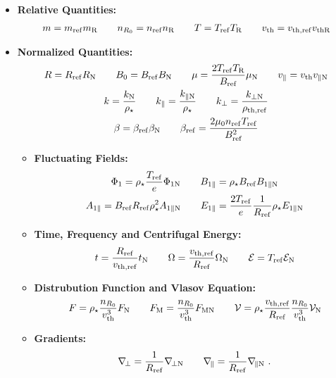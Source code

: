 \begin{itemize}
    \item \textbf{Relative Quantities:}
        \begin{gather}
            m = m_\mathrm{ref} m_\mathrm{R} \qquad n_{R_0} = n_\mathrm{ref} n_\mathrm{R} \qquad T = T_\mathrm{ref} T_\mathrm{R} \qquad v_\mathrm{th} = v_{\mathrm{th},\mathrm{ref}} v_{\mathrm{th} \mathrm{R}}
        \end{gather}
    \item \textbf{Normalized Quantities:}
        \begin{gather}
            R = R_\mathrm{ref} R_\mathrm{N} \qquad B_0 = B_\mathrm{ref} B_\mathrm{N} \qquad \mu = \frac{2 T_\mathrm{ref} T_\mathrm{R}}{B_\mathrm{ref}} \mu_\mathrm{N} \qquad v_\parallel = v_\mathrm{th} v_{\parallel \mathrm{N}} \\
            k = \frac{k_\mathrm{N}}{\rho_\star} \qquad k_\parallel = \frac{k_{\parallel \mathrm{N}}}{\rho_\star} \qquad k_\perp = \frac{k_{\perp \mathrm{N}}}{\rho_{\mathrm{th},\mathrm{ref}}} \\
            \beta = \beta_\mathrm{ref} \beta_\mathrm{N} \qquad \beta_\mathrm{ref} = \frac{2 \mu_0 n_\mathrm{ref} T_\mathrm{ref}}{B_\mathrm{ref}^2}
        \end{gather}
        \begin{itemize}
            \item \textbf{Fluctuating Fields:}
                \begin{gather}
                    \Phi_1 = \rho_\star \frac{T_\mathrm{ref}}{e} \Phi_{1 \mathrm{N}} \qquad B_{1\parallel} = \rho_\star B_\mathrm{ref} B_{1\parallel \mathrm{N}} \\
                    A_{1\parallel} = B_\mathrm{ref} R_\mathrm{ref} \rho_\star^2 A_{1\parallel \mathrm{N}} \qquad E_{1\parallel} = \frac{2T_\mathrm{ref}}{e} \frac{1}{R_\mathrm{ref}} \rho_\star E_{1\parallel \mathrm{N}}
                \end{gather}
            \item \textbf{Time, Frequency and Centrifugal Energy:}
                \begin{gather}
                    t = \frac{R_\mathrm{ref}}{v_{\mathrm{th},\mathrm{ref}}} t_\mathrm{N} \qquad \Omega = \dfrac{v_{\mathrm{th},\mathrm{ref}}}{R_\mathrm{ref}} \Omega_\mathrm{N} \qquad \mathcal{E} = T_\mathrm{ref} \mathcal{E}_\mathrm{N}
                \end{gather}
            \item \textbf{Distrubution Function and Vlasov Equation:}
                \begin{gather}
                    F = \rho_\star \frac{n_{R_0}}{v_\mathrm{th}^3}F_\mathrm{N} \qquad F_\mathrm{M} = \frac{n_{R_0}}{v_\mathrm{th}^3} F_{\mathrm{M} \mathrm{N}} \qquad \mathcal{V} = \rho_\star \frac{v_{\mathrm{th},\mathrm{ref}}}{R_\mathrm{ref}}\frac{n_{R_0}}{v_\mathrm{th}^3}\mathcal{V}_\mathrm{N}
                \end{gather}
            \item \textbf{Gradients:}
                \begin{gather}
                    \nabla_{\!\perp} = \frac{1}{R_\mathrm{ref}} \nabla_{\!\perp \mathrm{N}} \qquad \nabla_{\!\parallel} = \frac{1}{R_\mathrm{ref}} \nabla_{\!\parallel \mathrm{N}} ~.
                \end{gather}
        \end{itemize}
\end{itemize}

